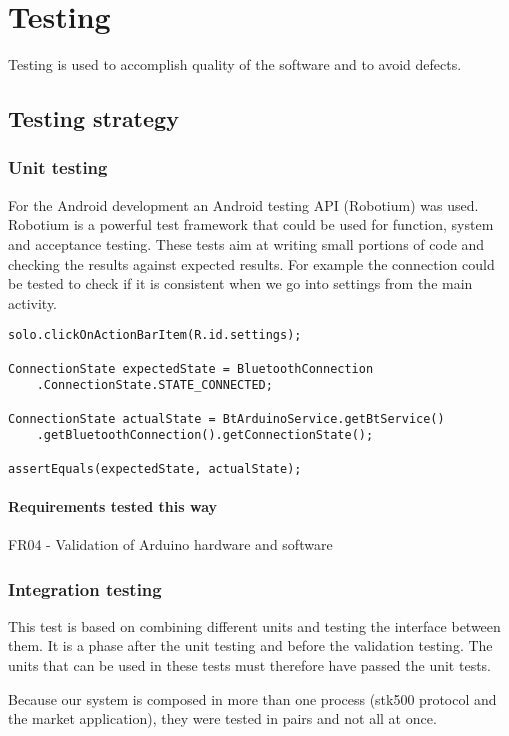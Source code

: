 \chapter{Testing}
	Testing is used to accomplish quality of the software and to avoid defects.
	
	\section{Testing strategy}
		\subsection{Unit testing}
			For the Android development an Android testing API (Robotium) was used.
			Robotium is a powerful test framework that could be used for function, system and acceptance testing.
			These tests aim at writing small portions of code and checking the results against expected results.
			For example the connection could be tested to check if it is consistent when we go into settings from the main activity.\\

			\begin{lstlisting}
solo.clickOnActionBarItem(R.id.settings);

ConnectionState expectedState = BluetoothConnection
	.ConnectionState.STATE_CONNECTED;
	
ConnectionState actualState = BtArduinoService.getBtService()
	.getBluetoothConnection().getConnectionState();

assertEquals(expectedState, actualState);
			\end{lstlisting}

			\subsubsection{Requirements tested this way}
			FR04 - Validation of Arduino hardware and software

		\subsection{Integration testing}
			This test is based on combining different units and testing the interface between them. It is a phase after the unit testing and before the validation testing. The units that can be used in these tests must therefore have passed the unit tests.

			Because our system is composed in more than one process (stk500 protocol and the market application), they
			were tested in pairs and not all at once.

